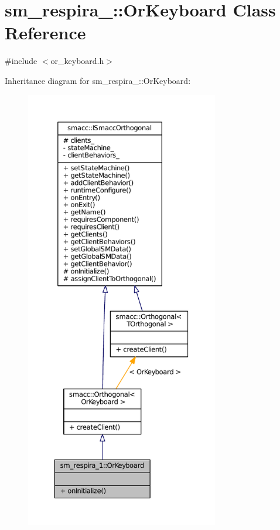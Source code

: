 \hypertarget{classsm__respira__1_1_1OrKeyboard}{}\section{sm\+\_\+respira\+\_\+:\+:Or\+Keyboard Class Reference}
\label{classsm__respira__1_1_1OrKeyboard}


{\ttfamily \#include $<$or\+\_\+keyboard.\+h$>$}



Inheritance diagram for sm\+\_\+respira\+\_\+:\+:Or\+Keyboard\+:
\nopagebreak
\begin{figure}[H]
\begin{center}
\leavevmode
\includegraphics[height=550pt]{classsm__respira__1_1_1OrKeyboard__inherit__graph}
\end{center}
\end{figure}


